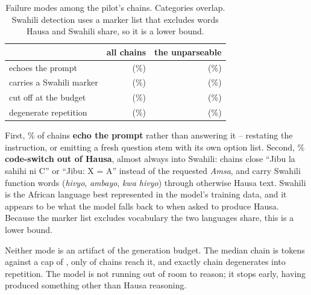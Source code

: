 \documentclass[11pt,a4paper]{article}
\begin{document}
\begin{table}[t]
  \centering
  \begin{tabular}{lrr}
    \toprule
     & all \FailChains{} chains & the \FailUnparsed{} unparseable \\
    \midrule
    echoes the prompt        & \FailAllPromptEchoN{} (\FailAllPromptEcho{}\%)
                             & \FailAnyPromptEchoN{} (\FailAnyPromptEcho{}\%) \\
    carries a Swahili marker & \FailAllSwahiliN{} (\FailAllSwahili{}\%)
                             & \FailAnySwahiliN{} (\FailAnySwahili{}\%) \\
    cut off at the budget    & \FailAllTruncatedN{} (\FailAllTruncated{}\%)
                             & \FailAnyTruncatedN{} (\FailAnyTruncated{}\%) \\
    degenerate repetition    & \FailAllRepetitionN{} (\FailAllRepetition{}\%)
                             & \FailAnyRepetitionN{} (\FailAnyRepetition{}\%) \\
    \bottomrule
  \end{tabular}
  \caption{Failure modes among the pilot's chains. Categories overlap. Swahili
  detection uses a marker list that excludes words Hausa and Swahili share, so
  it is a lower bound.}
  \label{tab:failmodes}
\end{table}

First, \FailAllPromptEcho{}\% of chains \textbf{echo the prompt} rather than
answering it -- restating the instruction, or emitting a fresh question stem
with its own option list. Second, \FailAllSwahili{}\% \textbf{code-switch out of
Hausa}, almost always into Swahili: chains close ``Jibu la sahihi ni C'' or
``Jibu: X = A'' instead of the requested \emph{Amsa}, and carry Swahili
function words (\emph{hivyo}, \emph{ambayo}, \emph{kwa hivyo}) through otherwise
Hausa text. Swahili is the African language best represented in the model's
training data, and it appears to be what the model falls back to when asked to
produce Hausa. Because the marker list excludes vocabulary the two languages
share, this is a lower bound.

Neither mode is an artifact of the generation budget. The median chain is
\FailMedianTokens{} tokens against a cap of \FailTokenBudget{}, only
\FailAtBudget{} of \FailChains{} chains reach it, and exactly
\FailAllRepetitionN{} chain degenerates into repetition. The model is not
running out of room to reason; it stops early, having produced something other
than Hausa reasoning.
\end{document}
